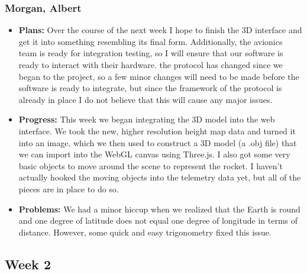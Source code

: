 \documentclass[10pt,draftclsnofoot,onecolumn]{IEEEtran}
\begin{document}
\subsubsection{Morgan, Albert}
\begin{itemize}
	\item \textbf{Plans: }
	Over the course of the next week I hope to finish the 3D interface and get it into something resembling its final form. Additionally, the avionics team is ready for integration testing, so I will ensure that our software is ready to interact with their hardware. the protocol has changed since we began to the project, so a few minor changes will need to be made before the software is ready to integrate, but since the framework of the protocol is already in place I do not believe that this will cause any major issues.
	\item \textbf{Progress: }
	This week we began integrating the 3D model into the web interface. We took the new, higher resolution height map data and turned it into an image, which we then used to construct a 3D model (a .obj file) that we can import into the WebGL canvas using Three.js. I also got some very basic objects to move around the scene to represent the rocket. I haven't actually hooked the moving objects into the telemetry data yet, but all of the pieces are in place to do so.
	\item \textbf{Problems: }
	We had a minor hiccup when we realized that the Earth is round and one degree of latitude does not equal one degree of longitude in terms of distance. However, some quick and easy trigonometry fixed this issue.
\end{itemize}

\subsection{Week 2}
\end{document}
